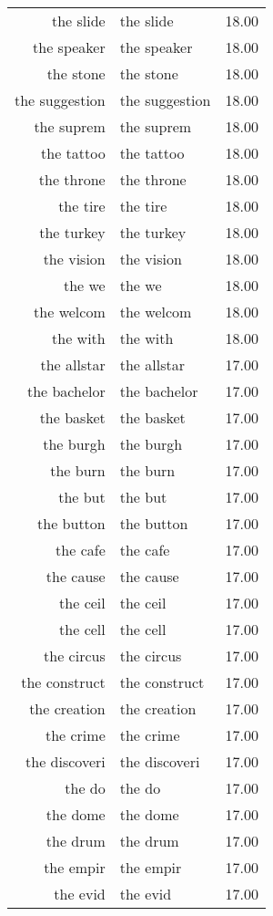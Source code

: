 \begin{table}[ht]
\begin{tabular}{rlr}
  the slide & the slide & 18.00 \\ 
  the speaker & the speaker & 18.00 \\ 
  the stone & the stone & 18.00 \\ 
  the suggestion & the suggestion & 18.00 \\ 
  the suprem & the suprem & 18.00 \\ 
  the tattoo & the tattoo & 18.00 \\ 
  the throne & the throne & 18.00 \\ 
  the tire & the tire & 18.00 \\ 
  the turkey & the turkey & 18.00 \\ 
  the vision & the vision & 18.00 \\ 
  the we & the we & 18.00 \\ 
  the welcom & the welcom & 18.00 \\ 
  the with & the with & 18.00 \\ 
  the allstar & the allstar & 17.00 \\ 
  the bachelor & the bachelor & 17.00 \\ 
  the basket & the basket & 17.00 \\ 
  the burgh & the burgh & 17.00 \\ 
  the burn & the burn & 17.00 \\ 
  the but & the but & 17.00 \\ 
  the button & the button & 17.00 \\ 
  the cafe & the cafe & 17.00 \\ 
  the cause & the cause & 17.00 \\ 
  the ceil & the ceil & 17.00 \\ 
  the cell & the cell & 17.00 \\ 
  the circus & the circus & 17.00 \\ 
  the construct & the construct & 17.00 \\ 
  the creation & the creation & 17.00 \\ 
  the crime & the crime & 17.00 \\ 
  the discoveri & the discoveri & 17.00 \\ 
  the do & the do & 17.00 \\ 
  the dome & the dome & 17.00 \\ 
  the drum & the drum & 17.00 \\ 
  the empir & the empir & 17.00 \\ 
  the evid & the evid & 17.00 \\ 

\end{tabular}
\end{table}
